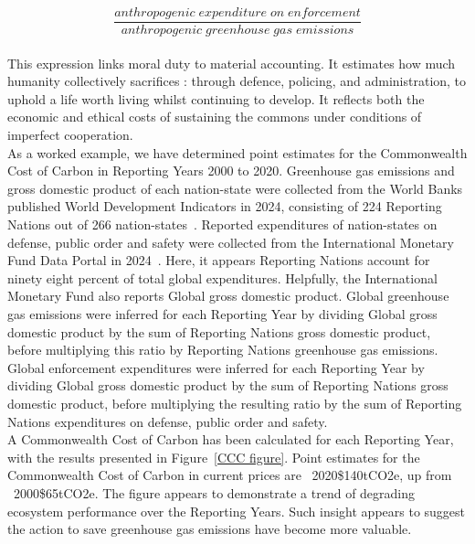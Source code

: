 \documentclass[12pt, oneside]{article}   	%
\begin{document}
\begin{equation}
	\frac{anthropogenic\; expenditure\; on\; enforcement}{anthropogenic\; greenhouse\; gas\; emissions}
\end{equation}\\

This expression links moral duty to material accounting.
It estimates how much humanity collectively sacrifices : through defence, policing, and administration, to uphold a life worth living whilst continuing to develop.
It reflects both the economic and ethical costs of sustaining the commons under conditions of imperfect cooperation.\\

As a worked example, we have determined point estimates for the Commonwealth Cost of Carbon in Reporting Years 2000 to 2020.
Greenhouse gas emissions and gross domestic product of each nation-state were collected from the World Banks published World Development Indicators in 2024, consisting of 224 Reporting Nations out of 266 nation-states~\cite{wbank}.
Reported expenditures of nation-states on defense, public order and safety were collected from the International Monetary Fund Data Portal in 2024~\cite{imf}.
Here, it appears Reporting Nations account for ninety eight percent of total global expenditures.
Helpfully, the International Monetary Fund also reports Global gross domestic product.
Global greenhouse gas emissions were inferred for each Reporting Year by dividing Global gross domestic product by the sum of Reporting Nations gross domestic product, before multiplying this ratio by Reporting Nations greenhouse gas emissions.
Global enforcement expenditures were inferred for each Reporting Year by dividing Global gross domestic product by the sum of Reporting Nations gross domestic product, before multiplying the resulting ratio by the sum of Reporting Nations expenditures on defense, public order and safety.\\
A Commonwealth Cost of Carbon has been calculated for each Reporting Year, with the results presented in Figure~\ref{CCC figure}.
Point estimates for the Commonwealth Cost of Carbon in current prices are ~2020\$140tCO2e, up from ~2000\$65tCO2e.
The figure appears to demonstrate a trend of degrading ecosystem performance over the Reporting Years.
Such insight appears to suggest the action to save greenhouse gas emissions have become more valuable.\\
\end{document}
